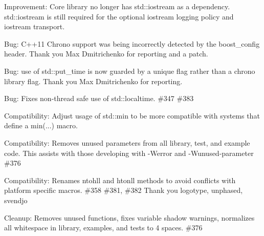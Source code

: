 \begin{DoxyItemize}
\item Improvement\+: Core library no longer has std\+::iostream as a dependency. std\+::iostream is still required for the optional iostream logging policy and iostream transport.
\item Bug\+: C++11 Chrono support was being incorrectly detected by the {\ttfamily boost\+\_\+config} header. Thank you Max Dmitrichenko for reporting and a patch.
\item Bug\+: use of {\ttfamily std\+::put\+\_\+time} is now guarded by a unique flag rather than a chrono library flag. Thank you Max Dmitrichenko for reporting.
\item Bug\+: Fixes non-\/thread safe use of std\+::localtime. \#347 \#383
\item Compatibility\+: Adjust usage of std\+::min to be more compatible with systems that define a min(...) macro.
\item Compatibility\+: Removes unused parameters from all library, test, and example code. This assists with those developing with -\/\+Werror and -\/\+Wunused-\/parameter \#376
\item Compatibility\+: Renames ntohll and htonll methods to avoid conflicts with platform specific macros. \#358 \#381, \#382 Thank you logotype, unphased, svendjo
\item Cleanup\+: Removes unused functions, fixes variable shadow warnings, normalizes all whitespace in library, examples, and tests to 4 spaces. \#376
\end{DoxyItemize}

